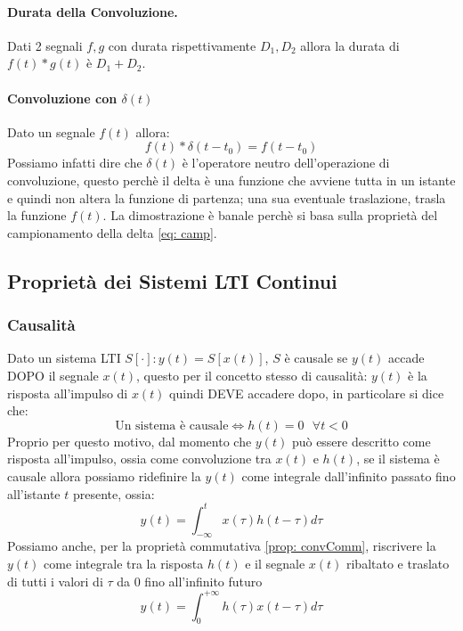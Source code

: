 \paragraph{Durata della Convoluzione.}Dati 2 segnali $f,g$ con durata rispettivamente $D_1,D_2$ allora la durata di $f(t) \ast g(t)$ è $D_1 + D_2$.

\paragraph{Convoluzione con $\delta(t)$} Dato un segnale $f(t)$ allora:
\begin{equation} \label{prop: ConvDelta}
    f(t) \ast \delta(t - t_0) = f(t - t_0)
\end{equation}
Possiamo infatti dire che $\delta(t)$ è l'operatore neutro dell'operazione di convoluzione, questo perchè il delta è una funzione che avviene tutta in un istante e quindi non altera la funzione di partenza; una sua eventuale traslazione, trasla la funzione $f(t)$. La dimostrazione è banale perchè si basa sulla proprietà del campionamento della delta \eqref{eq: camp}.



\newpage

\subsection{Proprietà dei Sistemi LTI Continui}
\subsubsection{Causalità} \label{prop: causalita}
Dato un sistema LTI $S[\cdot] : y(t) = S[x(t)]$, $S$ è causale se $y(t)$ accade DOPO il segnale $x(t)$, questo per il concetto stesso di causalità:
$y(t)$ è la risposta all'impulso di $x(t)$ quindi DEVE accadere dopo, in particolare si dice che:\\
\begin{equation}
    \mbox{Un sistema è causale} \Longleftrightarrow h(t) = 0 \mbox{  } \forall t < 0
\end{equation}
Proprio per questo motivo, dal momento che $y(t)$ può essere descritto come risposta all'impulso, ossia come convoluzione tra $x(t)$ e $h(t)$, se 
il sistema è causale allora possiamo ridefinire la $y(t)$ come integrale dall'infinito passato fino all'istante $t$ presente, ossia:
\begin{equation}
    y(t) = \int_{-\infty}^{t} x(\tau) h(t - \tau) d\tau
\end{equation}
Possiamo anche, per la proprietà commutativa \eqref{prop: convComm}, riscrivere la $y(t)$ come integrale tra la risposta $h(t)$ e il segnale $x(t)$ ribaltato e traslato
di tutti i valori di $\tau$ da 0 fino all'infinito futuro
\begin{equation}
    y(t) = \int_{0}^{+\infty} h(\tau)x(t - \tau) d\tau
\end{equation}

